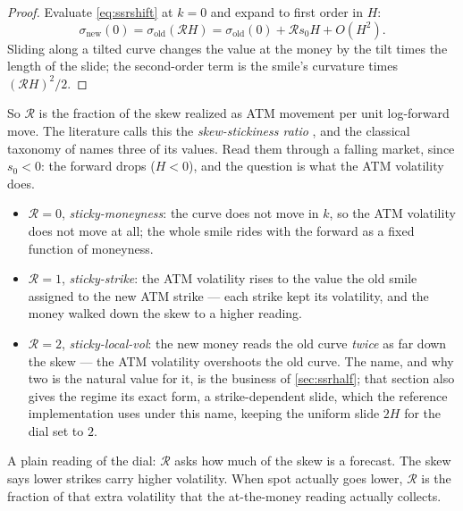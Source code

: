 \begin{proof}
Evaluate \eqref{eq:ssrshift} at $k=0$ and expand to first order in
$H$:
\[
\sigma_{\mathrm{new}}(0)
=\sigma_{\mathrm{old}}(\mathcal{R}H)
=\sigma_{\mathrm{old}}(0)+\mathcal{R}s_0H+O(H^{2}) .
\]
Sliding along a tilted curve changes the value at the money by the
tilt times the length of the slide; the second-order term is the
smile's curvature times $(\mathcal{R}H)^2/2$.
\end{proof}

So $\mathcal{R}$ is the fraction of the skew realized as ATM movement
per unit log-forward move.  The literature calls this the
\emph{skew-stickiness ratio} \citep{Bergomi2016}, and the classical
taxonomy of \citet{Derman1999} names three of its values.  Read them
through a falling market, since $s_0<0$: the forward drops
($H<0$), and the question is what the ATM volatility does.
\begin{itemize}
\item $\mathcal{R}=0$, \emph{sticky-moneyness}: the curve does not
move in $k$, so the ATM volatility does not move at all; the whole
smile rides with the forward as a fixed function of moneyness.
\item $\mathcal{R}=1$, \emph{sticky-strike}: the ATM volatility rises
to the value the old smile assigned to the new ATM strike --- each
strike kept its volatility, and the money walked down the skew to a
higher reading.
\item $\mathcal{R}=2$, \emph{sticky-local-vol}: the new money reads the
old curve \emph{twice} as far down the skew --- the ATM volatility
overshoots the old curve.  The name,
and why two is the natural value for it, is the business of
\cref{sec:ssrhalf}; that section also gives the regime its exact
form, a strike-dependent slide, which the reference implementation
uses under this name, keeping the uniform slide $2H$ for the dial
set to $2$.
\end{itemize}
A plain reading of the dial: $\mathcal{R}$ asks how much of the skew
is a forecast.  The skew says lower strikes carry higher volatility.
When spot actually goes lower, $\mathcal{R}$ is the fraction of that
extra volatility that the at-the-money reading actually
collects.

